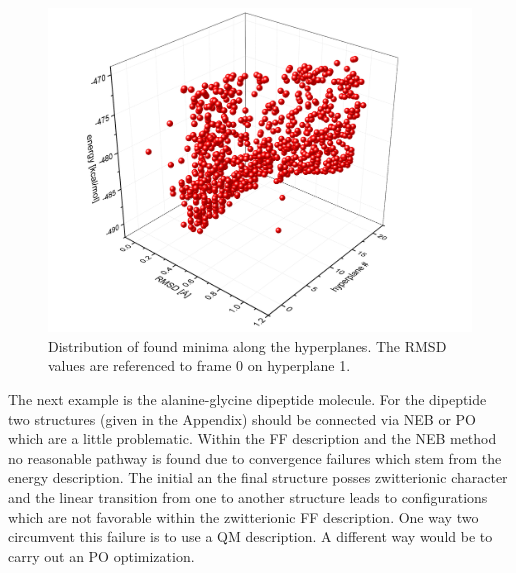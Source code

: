 \documentclass[a4paper,11pt]{scrartcl}
\begin{document}
\begin{figure}[H]
		\center
		\includegraphics[scale=0.4]{Pathopt/trideca_energies.png}\caption{Distribution of found minima along the hyperplanes. The RMSD values are referenced to frame 0 on hyperplane 1.}
\label{fig:tridecaenergy}
\end{figure}

The next example is the alanine-glycine dipeptide molecule. For the dipeptide two structures (given in the Appendix) should be connected via NEB  or PO which are a little problematic. Within the FF description and the NEB method no reasonable pathway is found due to convergence failures which stem from the energy description. The initial an the final structure posses zwitterionic character and the linear transition from one to another structure leads to configurations which are not favorable within the zwitterionic FF description. One way two circumvent this failure is to use a QM description. A different way would be to carry out an PO optimization.  
\end{document}

